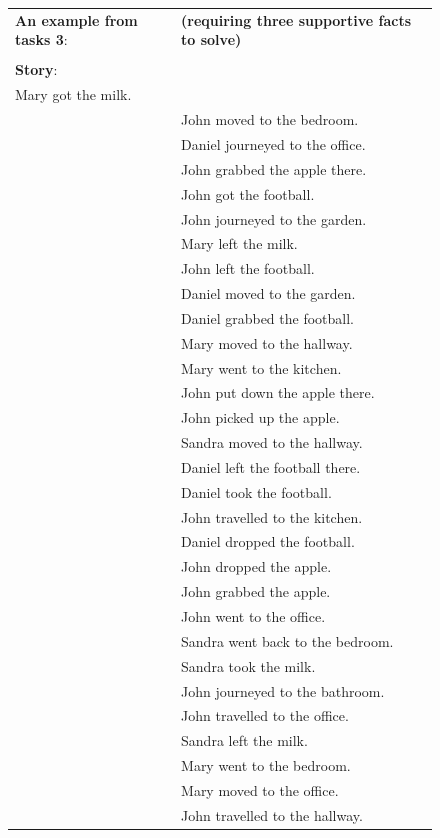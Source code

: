 \begin{figure}[!h]
\begin{minipage}{\textwidth}
\fontsize{8}{8}\selectfont
\begin{tabular}{l l}
\textbf{An example from tasks 3}: & \textbf{(requiring three supportive facts to solve)}\\
\\

\textbf{Story}: & \\
Mary got the milk. \\
& John moved to the bedroom. \\
& Daniel journeyed to the office. \\
& John grabbed the apple there. \\
& John got the football. \\
& John journeyed to the garden. \\
& Mary left the milk. \\
& John left the football. \\
& Daniel moved to the garden. \\
& Daniel grabbed the football. \\
& Mary moved to the hallway. \\
& Mary went to the kitchen. \\
& John put down the apple there. \\
& John picked up the apple. \\
& Sandra moved to the hallway. \\
& Daniel left the football there. \\
& Daniel took the football. \\
& John travelled to the kitchen. \\
& Daniel dropped the football. \\
& John dropped the apple. \\
& John grabbed the apple. \\
& John went to the office. \\
& Sandra went back to the bedroom. \\
& Sandra took the milk. \\
& John journeyed to the bathroom. \\
& John travelled to the office. \\
& Sandra left the milk. \\
& Mary went to the bedroom. \\
& Mary moved to the office. \\
& John travelled to the hallway. \\

\end{tabular}
\end{minipage}
\end{figure}
